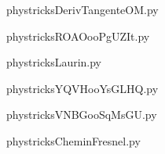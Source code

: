     \newcommand{\CaptionFigDerivTangenteOM}{<+Type your caption here+>}
    \begin{center}
        
    \end{center}
    phystricksDerivTangenteOM.py

    

    \clearpage
    


    \newcommand{\CaptionFigROAOooPgUZIt}{<+Type your caption here+>}
    \begin{center}
        
    \end{center}
    phystricksROAOooPgUZIt.py

    

    \clearpage
    


    \newcommand{\CaptionFigLaurin}{<+Type your caption here+>}
    \begin{center}
        
    \end{center}
    phystricksLaurin.py

    

    \clearpage
    


    \newcommand{\CaptionFigYQVHooYsGLHQ}{<+Type your caption here+>}
    \begin{center}
        
    \end{center}
    phystricksYQVHooYsGLHQ.py

    

    \clearpage
    


    \newcommand{\CaptionFigVNBGooSqMsGU}{<+Type your caption here+>}
    \begin{center}
        
    \end{center}
    phystricksVNBGooSqMsGU.py

    

    \clearpage
    


    \newcommand{\CaptionFigCheminFresnel}{<+Type your caption here+>}
    \begin{center}
        
    \end{center}
    phystricksCheminFresnel.py

